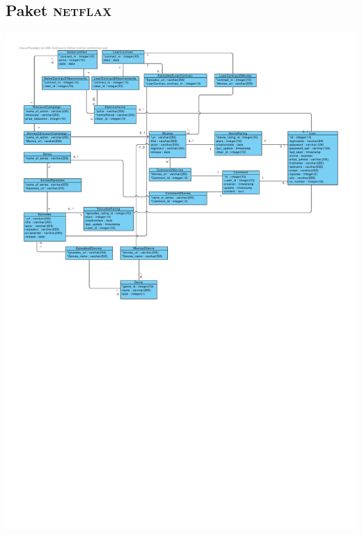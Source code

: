 \documentclass[11pt,a4paper,DIV=9]{scrartcl}
\begin{document}
  \subsection{Paket \textsc{netflax}}
    \includegraphics[angle=90,trim=0cm 0cm 1.1cm 1cm, clip=true, scale=1]{Diagramme/Paket_Netflax}
\end{document}
